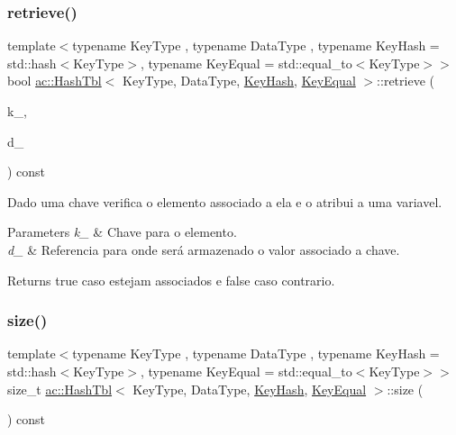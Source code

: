 \subsubsection{\texorpdfstring{retrieve()}{retrieve()}}
{\footnotesize\ttfamily template$<$typename Key\+Type , typename Data\+Type , typename Key\+Hash  = std\+::hash$<$\+Key\+Type$>$, typename Key\+Equal  = std\+::equal\+\_\+to$<$\+Key\+Type$>$$>$ \\
bool \hyperlink{classac_1_1_hash_tbl}{ac\+::\+Hash\+Tbl}$<$ Key\+Type, Data\+Type, \hyperlink{struct_key_hash}{Key\+Hash}, \hyperlink{struct_key_equal}{Key\+Equal} $>$\+::retrieve (\begin{DoxyParamCaption}\item[{const Key\+Type \&}]{k\+\_\+,  }\item[{Data\+Type \&}]{d\+\_\+ }\end{DoxyParamCaption}) const\hspace{0.3cm}{\ttfamily [inline]}}

Dado uma chave verifica o elemento associado a ela e o atribui a uma variavel. 
\begin{DoxyParams}{Parameters}
{\em k\+\_\+} & Chave para o elemento. \\
\hline
{\em d\+\_\+} & Referencia para onde será armazenado o valor associado a chave. \\
\hline
\end{DoxyParams}
\begin{DoxyReturn}{Returns}
true caso estejam associados e false caso contrario. 
\end{DoxyReturn}
\mbox{\label{classac_1_1_hash_tbl_a45333095393049ed1e67859e99ab3701}} 
\subsubsection{\texorpdfstring{size()}{size()}}
{\footnotesize\ttfamily template$<$typename Key\+Type , typename Data\+Type , typename Key\+Hash  = std\+::hash$<$\+Key\+Type$>$, typename Key\+Equal  = std\+::equal\+\_\+to$<$\+Key\+Type$>$$>$ \\
size\+\_\+t \hyperlink{classac_1_1_hash_tbl}{ac\+::\+Hash\+Tbl}$<$ Key\+Type, Data\+Type, \hyperlink{struct_key_hash}{Key\+Hash}, \hyperlink{struct_key_equal}{Key\+Equal} $>$\+::size (\begin{DoxyParamCaption}\item[{void}]{ }\end{DoxyParamCaption}) const\hspace{0.3cm}{\ttfamily [inline]}}

